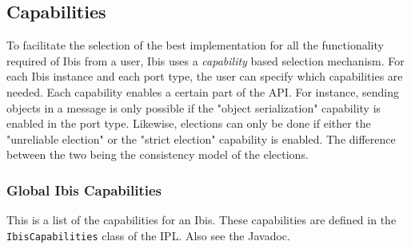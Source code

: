 \documentclass[10pt]{article}
\begin{document}
\subsection{Capabilities}

To facilitate the selection of the best implementation for all the
functionality required of Ibis from a user, Ibis uses a
\emph{capability} based selection mechanism. For each Ibis instance and
each port type, the user can specify which capabilities are needed. Each
capability enables a certain part of the API. For instance, sending
objects in a message is only possible if the "object serialization"
capability is enabled in the port type. Likewise, elections can only be
done if either the "unreliable election" or the "strict election"
capability is enabled. The difference between the two being the
consistency model of the elections. 

\subsubsection{Global Ibis Capabilities}

This is a list of the capabilities for an Ibis. These capabilities are
defined in the \texttt{IbisCapabilities} class of the IPL. Also see the
Javadoc.  
\end{document}
